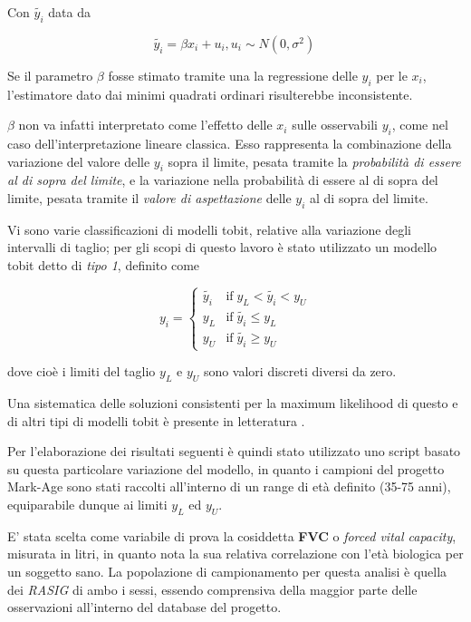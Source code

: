 \documentclass[12pt,openright,twoside,a4paper]{book}
\begin{document}
Con $\tilde{y_i}$ data da 

\begin{equation}
\tilde{y_i} = \beta x_i + u_i, u_i \sim N(0,\sigma^2) \, 
\end{equation}

Se il parametro $\beta$ fosse stimato tramite una la regressione delle $y_i$ per le $x_i$, l'estimatore dato dai minimi quadrati ordinari risulterebbe inconsistente. 

$\beta$ non va infatti interpretato come l'effetto delle $x_i$ sulle osservabili $y_i$, come nel caso dell'interpretazione lineare classica.
Esso rappresenta la combinazione della variazione del valore delle $y_i$ sopra il limite, pesata tramite la \textit{probabilità di essere al di sopra del limite}, e la variazione nella probabilità di essere al di sopra del limite, pesata tramite il \textit{valore di aspettazione} delle $y_i$ al di sopra del limite. \cite{tobit}

Vi sono varie classificazioni di modelli tobit, relative alla variazione degli intervalli di taglio; per gli scopi di questo lavoro è stato utilizzato un modello tobit detto di \textit{tipo 1}, definito come

\begin{equation}
 y_i = \begin{cases} 
   \tilde{y_i} & \textrm{if} \; y_L<\tilde{y_i}<y_U \\ 
    y_L   & \textrm{if} \; \tilde{y_i} \leq y_L \\
    y_U   & \textrm{if} \; \tilde{y_i} \geq y_U
\end{cases}
\end{equation}

dove cioè i limiti del taglio $y_L$ e $y_U$ sono valori discreti diversi da zero.

Una sistematica delle soluzioni consistenti per la maximum likelihood di questo e di altri tipi di modelli tobit è presente in letteratura \cite{tobitMLE}.

Per l'elaborazione dei risultati seguenti è quindi stato utilizzato uno script basato su questa particolare variazione del modello, in quanto i campioni del progetto Mark-Age sono stati raccolti all'interno di un range di età definito (35-75 anni), equiparabile dunque ai limiti $y_L$ ed $y_U$.

E' stata scelta come variabile di prova la cosiddetta \textbf{FVC} o \textit{forced vital capacity}, misurata in litri, in quanto nota la sua relativa correlazione con l'età biologica per un soggetto sano.
La popolazione di campionamento per questa analisi è quella dei \textit{RASIG} di ambo i sessi, essendo comprensiva della maggior parte delle osservazioni all'interno del database del progetto.
\end{document}
